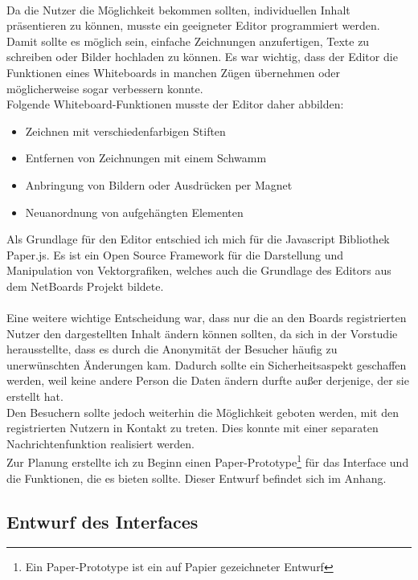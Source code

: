 \\
Da die Nutzer die Möglichkeit bekommen sollten, individuellen Inhalt präsentieren zu können, musste ein geeigneter Editor programmiert werden.
Damit sollte es möglich sein, einfache Zeichnungen anzufertigen, Texte zu schreiben oder Bilder hochladen zu können.
Es war wichtig, dass der Editor die Funktionen eines Whiteboards in manchen Zügen übernehmen oder möglicherweise sogar verbessern konnte.
\\
Folgende Whiteboard-Funktionen musste der Editor daher abbilden:
\begin{itemize}
  \item Zeichnen mit verschiedenfarbigen Stiften
  \item Entfernen von Zeichnungen mit einem Schwamm
  \item Anbringung von Bildern oder Ausdrücken per Magnet
  \item Neuanordnung von aufgehängten Elementen
\end{itemize}
Als Grundlage für den Editor entschied ich mich für die Javascript Bibliothek Paper.js.
Es ist ein Open Source Framework für die Darstellung und Manipulation von Vektorgrafiken, welches auch die Grundlage des Editors aus dem NetBoards Projekt bildete\cite{wood:2014}.
\\
\\
Eine weitere wichtige Entscheidung war, dass nur die an den Boards registrierten Nutzer den dargestellten Inhalt ändern können sollten, da sich in der Vorstudie herausstellte, dass es durch die Anonymität der Besucher häufig zu unerwünschten Änderungen kam.
Dadurch sollte ein Sicherheitsaspekt geschaffen werden, weil keine andere Person die Daten ändern durfte außer derjenige, der sie erstellt hat.
\\
Den Besuchern sollte jedoch weiterhin die Möglichkeit geboten werden, mit den registrierten Nutzern in Kontakt zu treten. Dies konnte mit einer separaten Nachrichtenfunktion realisiert werden.
\\
Zur Planung erstellte ich zu Beginn einen Paper-Prototype\footnote{Ein Paper-Prototype ist ein auf Papier gezeichneter Entwurf} für das Interface und die Funktionen, die es bieten sollte. Dieser Entwurf befindet sich im Anhang.










\subsection{Entwurf des Interfaces}\label{Entwurf des Interfaces}
